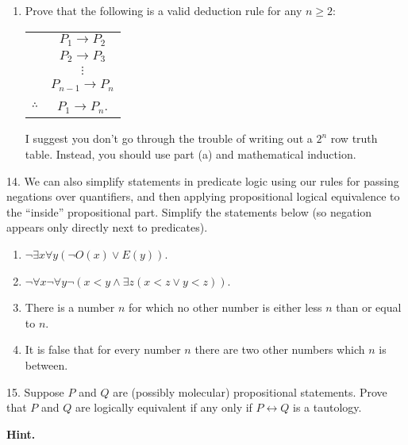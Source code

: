 \documentclass[10pt,]{book}
\theoremstyle{plain}
\theoremstyle{definition}
\numberwithin{equation}{chapter}
\newcommand{\hrulethin}  {\noalign{\hrule height 0.04em}}
\def\iff{\leftrightarrow}
\def\imp{\rightarrow}
\newcommand{\lt}{ < }
\begin{document}
\begin{exerciselist}
\begin{enumerate}[label=(\alph*)]
\item\hypertarget{li-655}{}
              Prove that the following is a valid deduction rule for any \(n \ge 2\):
              \leavevmode%
\begin{table}
\centering
\begin{tabular}{cc}
&\(P_1 \imp P_2\)\tabularnewline[0pt]
&\(P_2 \imp P_3\)\tabularnewline[0pt]
&\(\vdots\)\tabularnewline[0pt]
&\(P_{n-1} \imp P_n\)\tabularnewline\hrulethin
\(\therefore\)&\(P_1 \imp P_n\).
\end{tabular}
\end{table}

              I suggest you don't go through the trouble of writing out a \(2^n\) row truth table. Instead, you should use part (a) and mathematical induction.


\end{enumerate}
\par\smallskip
\item[14.]\hypertarget{exercise-239}{}
          We can also simplify statements in predicate logic using our rules for passing negations over quantifiers, and then applying propositional logical equivalence to the ``inside'' propositional part.  Simplify the statements below (so negation appears only directly next to predicates).
\leavevmode%
\begin{enumerate}[label=(\alph*)]
\item\hypertarget{li-656}{}\(\neg \exists x \forall y (\neg O(x) \vee E(y))\).%
\item\hypertarget{li-657}{}\(\neg \forall x \neg \forall y \neg(x \lt  y \wedge \exists z (x \lt  z \vee y \lt  z))\).%
\item\hypertarget{li-658}{}
              There is a number \(n\) for which no other number is either less \(n\) than or equal to \(n\).
\item\hypertarget{li-659}{}
              It is false that for every number \(n\) there are two other numbers which \(n\) is between.
\end{enumerate}
\par\smallskip
\item[15.]\hypertarget{exercise-240}{}
          Suppose \(P\) and \(Q\) are (possibly molecular) propositional statements.  Prove that \(P\) and \(Q\) are logically equivalent if any only if \(P \iff Q\) is a tautology.
\par\smallskip
\par\smallskip
\noindent\textbf{Hint.}\hypertarget{hint-13}{}\quad


\end{exerciselist}
\end{document}
